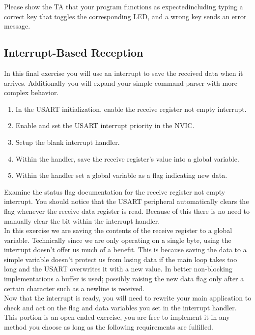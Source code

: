 \documentclass[openany,11pt,fleqn]{book} %
\begin{document}
\begin{assignment}
	Please show the TA that your program functions as expected\textemdash including typing a correct key that toggles the corresponding LED, and a wrong key sends an error message.
\end{assignment}

\subsection{Interrupt-Based Reception}
In this final exercise you will use an interrupt to save the received data when it arrives. Additionally you will expand your simple command parser with more complex behavior.

\begin{enumerate}
    \item In the USART initialization, enable the receive register not empty interrupt.
    \item Enable and set the USART interrupt priority in the NVIC.
    \item Setup the blank interrupt handler.
    \item Within the handler, save the receive register's value into a global variable.
    \item Within the handler set a global variable as a flag indicating new data. 
\end{enumerate} 

Examine the status flag documentation for the receive register not empty interrupt. You should notice that the USART peripheral automatically clears the flag whenever the receive data register is read. Because of this there is no need to manually clear the bit within the interrupt handler. \\

In this exercise we are saving the contents of the receive register to a global variable. Technically since we are only operating on a single byte, using the interrupt doesn't offer us much of a benefit. This is because saving the data to a simple variable doesn't protect us from losing data if the main loop takes too long and the USART overwrites it with a new value. In better non-blocking implementations a buffer is used; possibly raising the new data flag only after a certain character such as a newline is received.\\

Now that the interrupt is ready, you will need to rewrite your main application to check and act on the flag and data variables you set in the interrupt handler. This portion is an open-ended exercise, you are free to implement it in any method you choose as long as the following requirements are fulfilled. 
\end{document}
